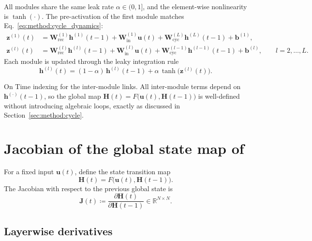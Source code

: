 All modules share the same leak rate $\alpha\in(0,1]$, and the element-wise nonlinearity is $\tanh(\cdot)$.
The pre-activation of the first module matches Eq.~\eqref{eq:method:cycle_dynamics}:
\begin{align}
\mathbf{z}^{(1)}(t) &=
\mathbf{W}_{\text{rec}}^{(1)} \mathbf{h}^{(1)}(t-1)
+ \mathbf{W}_{\text{in}}^{(1)} \mathbf{u}(t)
+ \mathbf{W}_{\text{cyc}}^{(L)} \mathbf{h}^{(L)}(t-1)
+ \mathbf{b}^{(1)}, \label{eq:dcr-z1}\\
\mathbf{z}^{(l)}(t) &=
\mathbf{W}_{\text{rec}}^{(l)} \mathbf{h}^{(l)}(t-1)
+ \mathbf{W}_{\text{in}}^{(l)} \mathbf{u}(t)
+ \mathbf{W}_{\text{cyc}}^{(l-1)} \mathbf{h}^{(l-1)}(t-1)
+ \mathbf{b}^{(l)},\qquad l=2,\dots,L. \label{eq:dcr-zl}
\end{align}
Each module is updated through the leaky integration rule
\begin{equation}
\mathbf{h}^{(l)}(t) = (1-\alpha)\,\mathbf{h}^{(l)}(t-1) + \alpha\,\tanh\big(\mathbf{z}^{(l)}(t)\big).
\label{eq:dcr-leak}
\end{equation}

\begin{remark} On Time indexing for the inter-module links.
All inter-module terms depend on $\mathbf{h}^{(\cdot)}(t-1)$, so the global map $\mathbf{H}(t)=F\big(\mathbf{u}(t),\mathbf{H}(t-1)\big)$ is well-defined without introducing algebraic loops, exactly as discussed in Section~\ref{sec:method:cycle}.
\end{remark}
\section{Jacobian of the global state map of  \DCR}
\label{sec:dcr-jacobian}

For a fixed input $\mathbf{u}(t)$, define the state transition map
\[
\mathbf{H}(t) = F\big(\mathbf{u}(t),\mathbf{H}(t-1)\big).
\]
The Jacobian with respect to the previous global state is
\[
\mathbf{J}(t) \coloneqq \frac{\partial \mathbf{H}(t)}{\partial \mathbf{H}(t-1)} \in \mathbb{R}^{N\times N}.
\]

\subsection{Layerwise derivatives}

